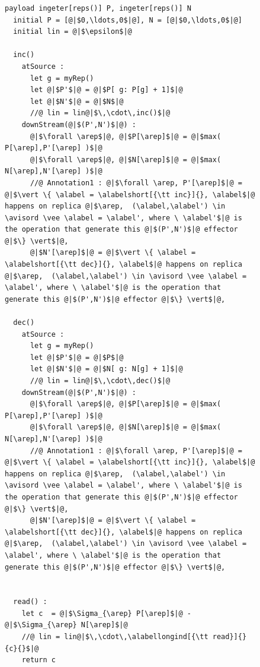 \begin{figure}[t]
\begin{lstlisting}[frame=top,caption={Pseudo-code of operation-based PN-counter},
captionpos=b,label={lst:operation-based PN-counter}]
  payload ingeter[reps()] P, ingeter[reps()] N
  initial P = [@|$0,\ldots,0$|@], N = [@|$0,\ldots,0$|@]
  initial lin = @|$\epsilon$|@

  inc()
    atSource :
      let g = myRep()
      let @|$P'$|@ = @|$P[ g: P[g] + 1]$|@
      let @|$N'$|@ = @|$N$|@
      //@ lin = lin@|$\,\cdot\,inc()$|@
    downStream(@|$(P',N')$|@) :
      @|$\forall \arep$|@, @|$P[\arep]$|@ = @|$max( P[\arep],P'[\arep] )$|@
      @|$\forall \arep$|@, @|$N[\arep]$|@ = @|$max( N[\arep],N'[\arep] )$|@
      //@ Annotation1 : @|$\forall \arep, P'[\arep]$|@ = @|$\vert \{ \alabel = \alabelshort[{\tt inc}]{}, \alabel$|@ happens on replica @|$\arep,  (\alabel,\alabel') \in \avisord \vee \alabel = \alabel', where \ \alabel'$|@ is the operation that generate this @|$(P',N')$|@ effector @|$\} \vert$|@,
      @|$N'[\arep]$|@ = @|$\vert \{ \alabel = \alabelshort[{\tt dec}]{}, \alabel$|@ happens on replica @|$\arep,  (\alabel,\alabel') \in \avisord \vee \alabel = \alabel', where \ \alabel'$|@ is the operation that generate this @|$(P',N')$|@ effector @|$\} \vert$|@,

  dec()
    atSource :
      let g = myRep()
      let @|$P'$|@ = @|$P$|@
      let @|$N'$|@ = @|$N[ g: N[g] + 1]$|@
      //@ lin = lin@|$\,\cdot\,dec()$|@
    downStream(@|$(P',N')$|@) :
      @|$\forall \arep$|@, @|$P[\arep]$|@ = @|$max( P[\arep],P'[\arep] )$|@
      @|$\forall \arep$|@, @|$N[\arep]$|@ = @|$max( N[\arep],N'[\arep] )$|@
      //@ Annotation1 : @|$\forall \arep, P'[\arep]$|@ = @|$\vert \{ \alabel = \alabelshort[{\tt inc}]{}, \alabel$|@ happens on replica @|$\arep,  (\alabel,\alabel') \in \avisord \vee \alabel = \alabel', where \ \alabel'$|@ is the operation that generate this @|$(P',N')$|@ effector @|$\} \vert$|@,
      @|$N'[\arep]$|@ = @|$\vert \{ \alabel = \alabelshort[{\tt dec}]{}, \alabel$|@ happens on replica @|$\arep,  (\alabel,\alabel') \in \avisord \vee \alabel = \alabel', where \ \alabel'$|@ is the operation that generate this @|$(P',N')$|@ effector @|$\} \vert$|@,


  read() :
    let c  = @|$\Sigma_{\arep} P[\arep]$|@ - @|$\Sigma_{\arep} N[\arep]$|@
    //@ lin = lin@|$\,\cdot\,\alabellongind[{\tt read}]{}{c}{}$|@
    return c
\end{lstlisting}
\end{figure}

